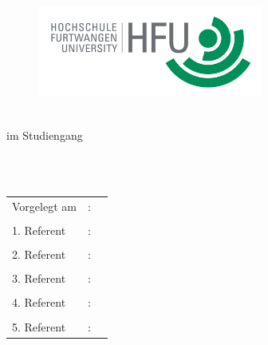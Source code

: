 \begin{titlepage}
\pagestyle{empty}

\begin{flushright}
\begin{figure}[ht]
\flushright
\includegraphics[height=3cm]{content/pictures/hfu.jpg}
\end{figure}
\end{flushright}

\begin{center}
{\fontsize{18}{22} \selectfont \docArtDerArbeit}\\[5mm]
{\fontsize{18}{22} \selectfont im Studiengang} \\[5mm]
{\fontsize{18}{22} \selectfont \docStudiengang}\\
\vspace{1cm}
\begin{onehalfspace}
{\fontsize{22}{26} \selectfont \textbf{\docTitle}}\\[5mm]
{\fontsize{18}{22} \selectfont \docUntertitle}


\end{onehalfspace}
\end{center}

\vfill
\begin{center}
\begin{tabular}{lcl}
Vorgelegt am 	&:& \docAbgabedatum 	\\ \\
1. Referent  		&:& \docErsterReferent 	\\ \\
2. Referent  		&:& \docZweiterReferent \\ \\
3. Referent  		&:& \docDritterReferent \\ \\
4. Referent  		&:& \docVierterReferent \\ \\
5. Referent  		&:& \docFuenfterReferent
\end{tabular}
\end{center}
\end{titlepage}